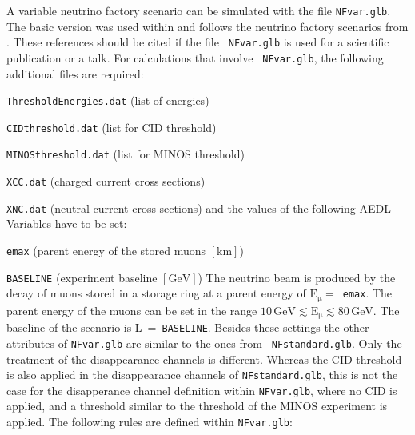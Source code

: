 A variable neutrino factory scenario can be simulated with the file {\tt NFvar.glb}. The basic version was
used within \cite{Huber:2006wb} and follows the neutrino factory scenarios from \cite{Huber:2002mx}. These
references should be cited if the file {\tt
NFvar.glb} is used for a scientific publication or a talk. For calculations that involve {\tt
NFvar.glb}, the following additional files are required:
\bi
\item {\tt ThresholdEnergies.dat} (list of energies)
\item {\tt CIDthreshold.dat} (list for CID threshold)
\item {\tt MINOSthreshold.dat} (list for MINOS threshold)
\item {\tt XCC.dat} (charged current cross sections)
\item {\tt XNC.dat} (neutral current cross sections)
\ei
and the values of the following {\sf AEDL}-Variables have to be set:
\bi
\item {\tt emax} (parent energy of the stored muons $\left[\mathrm{km}\right]$)
\item {\tt BASELINE} (experiment baseline $\left[\mathrm{GeV}\right]$)
\ei
The neutrino beam is produced by the decay of muons stored in a storage ring at a parent energy of
$\mathrm{E_\mu =}$~{\tt emax}. The parent energy of the muons can be set in the range
$\mathrm{10\,GeV\lesssim E_\mu\lesssim 80\, GeV}$. The baseline of the scenario is L~=~{\tt BASELINE}. 
Besides these settings the other attributes of {\tt NFvar.glb} are similar to the ones from {\tt
NFstandard.glb}. Only the treatment of the disappearance channels is different. Whereas the CID threshold is
also applied in the disappearance channels of {\tt NFstandard.glb}, this is not the case for the disapperance
channel definition within {\tt NFvar.glb}, where no CID is applied, and a threshold similar to the threshold of
the MINOS experiment \cite{Ables:1995wq} is applied. The following rules are defined within
{\tt NFvar.glb}:
